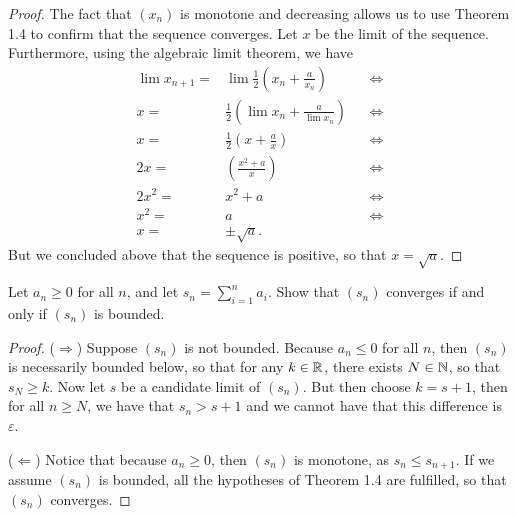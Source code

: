 \begin{proof}
The fact that $(x_n)$ is monotone and decreasing allows us to use Theorem 1.4 to confirm that the sequence converges. Let $x$ be the limit of the sequence. Furthermore, using the algebraic limit theorem, we have
\begin{align*}
    \lim x_{n+1} =& \lim \frac{1}{2}\left(x_n+\frac{a}{x_n}\right) &&\iff\\
    x =& \frac{1}{2}\left(\lim x_n+\frac{a}{\lim x_n}\right) &&\iff\\
    x =& \frac{1}{2}\left(x+\frac{a}{x}\right) &&\iff\\
    2x =& \left(\frac{x^2+a}{x}\right) &&\iff\\
    2x^2 =& x^2+a &&\iff\\
    x^2 =& a &&\iff\\
    x =& \pm\sqrt{a}.
\end{align*}
But we concluded above that the sequence is positive, so that $x=\sqrt{a}$.
\end{proof}

\begin{exercise}{13}
Let $a_n\geq 0$ for all $n$, and let $s_n=\sum_{i=1}^na_i$. Show that $(s_n)$ converges if and only if $(s_n)$ is bounded.
\end{exercise}
\begin{proof}
($\Rightarrow$) Suppose $(s_n)$ is not bounded. Because $a_n\leq 0$ for all $n$, then $(s_n)$ is necessarily bounded below, so that for any $k\in\mathbb{R}$, there exists $N\in\mathbb{N}$, so that $s_N\geq k$. Now let $s$ be a candidate limit of $(s_n)$. But then choose $k=s+1$, then for all $n\geq N$, we have that $s_n>s+1$ and we cannot have that this difference is $\varepsilon$.

($\Leftarrow$) Notice that because $a_n\geq 0$, then $(s_n)$ is monotone, as $s_n\leq s_{n+1}$. If we assume $(s_n)$ is bounded, all the hypotheses of Theorem 1.4 are fulfilled, so that $(s_n)$ converges.
\end{proof}

